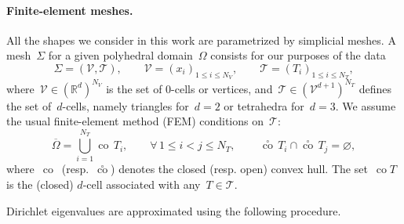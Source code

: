 \documentclass[a4]{article}
\newcommand{\R}{\mathbb{R}}
\newcommand{\1}{\mathbbm 1}
\DeclareMathOperator{\co}{co}
\begin{document}
\paragraph{Finite-element meshes.}
All the shapes we consider in this work are parametrized by simplicial meshes. A mesh~$\Sigma$ for a given polyhedral domain~$\Omega$ consists for our purposes of the data
\begin{equation}
    \label{eq:mesh}
    \Sigma = (\mathcal V,\mathcal T),\qquad\mathcal V = \left(x_i\right)_{1\leq i\leq N_V},\qquad \mathcal T=\left(T_i\right)_{1\leq i\leq N_T},
\end{equation}
where~$\mathcal V \in \left(\R^d\right)^{N_V}$ is the set of $0$-cells or vertices, and~$\mathcal T \in \left(\mathcal V^{d+1}\right)^{N_T}$ defines the set of~$d$-cells, namely triangles for~$d=2$ or tetrahedra for~$d=3$.
We assume the usual finite-element method (FEM) conditions on~$\mathcal T$:
\begin{equation}
    \label{eq:mesh_conditions}
    \overline{\Omega} = \bigcup_{i=1}^{N_T} \co\,T_i,\qquad \forall\,1\leq i < j \leq N_T,\qquad\, \overset{\circ}{\co}\,T_i\cap \overset{\circ}{\co}\,T_j= \varnothing,
\end{equation}
where~$\co$~(resp.~$\overset{\circ}{\co}$) denotes the closed (resp. open) convex hull. The set~$\co T$ is the (closed) $d$-cell associated with any~$T\in\mathcal T$.

Dirichlet eigenvalues are approximated using the following procedure.
\end{document}
